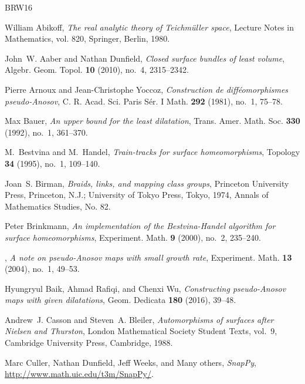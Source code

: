 \documentclass{amsart}
\theoremstyle{definition}
\theoremstyle{remark}
\begin{document}
\begin{thebibliography}{BRW16}

William Abikoff, \emph{The real analytic theory of {T}eichm\"uller space},
  Lecture Notes in Mathematics, vol. 820, Springer, Berlin, 1980. 

John~W. Aaber and Nathan Dunfield, \emph{Closed surface bundles of least
  volume}, Algebr. Geom. Topol. \textbf{10} (2010), no.~4, 2315--2342.

Pierre Arnoux and Jean-Christophe Yoccoz, \emph{Construction de
  diff\'{e}omorphismes pseudo-{A}nosov}, C. R. Acad. Sci. Paris S\'{e}r. I
  Math. \textbf{292} (1981), no.~1, 75--78. 

Max Bauer, \emph{An upper bound for the least dilatation}, Trans. Amer. Math.
  Soc. \textbf{330} (1992), no.~1, 361--370. 

M.~Bestvina and M.~Handel, \emph{Train-tracks for surface homeomorphisms},
  Topology \textbf{34} (1995), no.~1, 109--140. 

Joan~S. Birman, \emph{Braids, links, and mapping class groups}, Princeton
  University Press, Princeton, N.J.; University of Tokyo Press, Tokyo, 1974,
  Annals of Mathematics Studies, No. 82. 

Peter Brinkmann, \emph{An implementation of the {B}estvina-{H}andel algorithm
  for surface homeomorphisms}, Experiment. Math. \textbf{9} (2000), no.~2,
  235--240. 

\bysame, \emph{A note on pseudo-{A}nosov maps with small growth rate},
  Experiment. Math. \textbf{13} (2004), no.~1, 49--53. 

Hyungryul Baik, Ahmad Rafiqi, and Chenxi Wu, \emph{Constructing pseudo-{A}nosov
  maps with given dilatations}, Geom. Dedicata \textbf{180} (2016), 39--48.

Andrew~J. Casson and Steven~A. Bleiler, \emph{Automorphisms of surfaces after
  {N}ielsen and {T}hurston}, London Mathematical Society Student Texts, vol.~9,
  Cambridge University Press, Cambridge, 1988. 

Marc Culler, Nathan Dunfield, Jeff Weeks, and Many others, \emph{{S}nap{P}y},
  \url{http://www.math.uic.edu/t3m/SnapPy/}.


\end{thebibliography}
\end{document}
